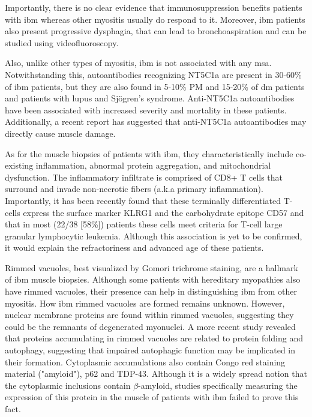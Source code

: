 Importantly, there is no clear evidence that immunosuppression benefits patients with \gls{ibm} whereas other myositis usually do respond to it.\cite{SelvaOCallaghan2018} Moreover, \gls{ibm} patients also present progressive dysphagia,\cite{SelvaOCallaghan2018} that can lead to bronchoaspiration and can be studied using videofluoroscopy. 

Also, unlike other types of myositis, \gls{ibm} is not associated with any \gls{msa}. Notwithstanding this, autoantibodies recognizing NT5C1a are present in 30-60\% of \gls{ibm} patients, but they are also found in 5-10\% PM and 15-20\% of \gls{dm} patients and patients with lupus and Sjögren's syndrome.\cite{Lloyd2016,Herbert2016,Muro2017,Lilleker2017} Anti-NT5C1a autoantibodies have been associated with increased severity and mortality in these patients.\cite{Lilleker2017,Goyal2016} Additionally, a recent report has suggested that anti-NT5C1a autoantibodies may directly cause muscle damage.\cite{Tawara2017}

As for the muscle biopsies of patients with \gls{ibm}, they characteristically include co-existing inflammation, abnormal protein aggregation, and mitochondrial dysfunction.\cite{Dalakas2002} The inflammatory infiltrate is comprised of CD8+ T cells that surround and invade non-necrotic fibers (a.k.a primary inflammation). Importantly, it has been recently found that these terminally differentiated T-cells express the surface marker KLRG1 and the carbohydrate epitope CD57 and that in most (22/38 [58\%]) patients these cells meet criteria for T-cell large granular lymphocytic leukemia.\cite{Greenberg2016,Greenberg2019} Although this association is yet to be confirmed, it would explain the refractoriness and advanced age of these patients.\cite{Greenberg2016,Greenberg2019,Greenberg2019a}

Rimmed vacuoles, best visualized by Gomori trichrome staining, are a hallmark of \gls{ibm} muscle biopsies. Although some patients with hereditary myopathies also have rimmed vacuoles, their presence can help in distinguishing \gls{ibm} from other myositis.\cite{Dalakas2002} How \gls{ibm} rimmed vacuoles are formed remains unknown. However, nuclear membrane proteins are found within rimmed vacuoles, suggesting they could be the remnants of degenerated myonuclei.\cite{Greenberg2006,Nalbantoglu1994} A more recent study revealed that proteins accumulating in rimmed vacuoles are related to protein folding and autophagy, suggesting that impaired autophagic function may be implicated in their formation.\cite{Guttsches2017} Cytoplasmic accumulations also contain Congo red staining material ("amyloid"), p62 and TDP-43.\cite{Dalakas2002} Although it is a widely spread notion that the cytoplasmic inclusions contain $\beta$-amyloid, studies specifically measuring the expression of this protein in the muscle of patients with \gls{ibm} failed to prove this fact.\cite{Greenberg2010,Nalbantoglu1994}

